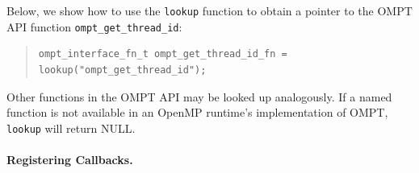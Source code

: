 \documentclass{article}
\begin{document}
Below, we show how to use the \verb|lookup| function to obtain a pointer to the OMPT API function \verb|ompt_get_thread_id|:

\begin{quote}
\begin{verbatim}
ompt_interface_fn_t ompt_get_thread_id_fn = lookup("ompt_get_thread_id");
\end{verbatim}
\end{quote}
Other functions in the OMPT API may be looked up analogously.
If a named function is not available in an OpenMP runtime's implementation of OMPT, \verb|lookup| will return NULL.

\paragraph{Registering Callbacks.} 
\end{document}
